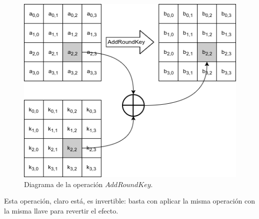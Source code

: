 \begin{figure}
  \begin{center}
    \includegraphics[width=0.6\linewidth]{diagramas/addRoundKey}
    \caption{Diagrama de la operación $AddRoundKey$.}
   \end{center}
\end{figure}

Esta operación, claro está, es invertible: basta con aplicar la misma
operación con la misma llave para revertir el efecto.
